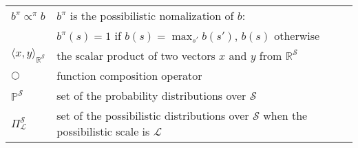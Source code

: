 \begin{supertabular}{ll}
  $b^{\pi} \propto^{\pi} b$ & $b^{\pi}$ is the possibilistic nomalization of $b$:\\
	&  $b^{\pi}(s) = 1$ if $b(s) = \max_{s'}b(s')$, $b(s)$ otherwise\\
  $\langle x, y \rangle_{\mathbb{R}^{\mathcal{S}}}$ & the scalar product of two vectors $x$ and $y$ from $\mathbb{R}^{\mathcal{S}}$\\
  $\Circle$ & function composition operator\\
  $\mathbb{P}^{\mathcal{S}}$ & set of the probability distributions over $\mathcal{S}$\\
  $\Pi^{\mathcal{S}}_{\mathcal{L}}$ & set of the possibilistic distributions over $\mathcal{S}$ when the possibilistic scale is $\mathcal{L}$\\
\end{supertabular}

\chapterend

